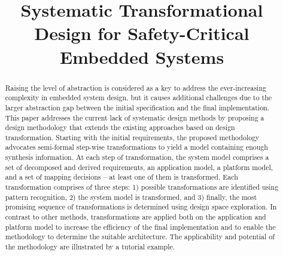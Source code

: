 \documentclass[conference]{IEEEtran}
\theoremstyle{definition}
\begin{document}
\title{Systematic Transformational Design for Safety-Critical Embedded Systems\\
}

\author{
}

\maketitle

\begin{abstract}
Raising the level of abstraction is considered as a key to address the ever-increasing complexity in embedded system design, but it causes additional challenges due to the larger abstraction gap between the initial specification and the final implementation. This paper addresses the current lack of systematic design methods by proposing a  design methodology that extends the existing approaches based on design transformation. Starting with the initial requirements, the proposed methodology advocates semi-formal step-wise transformations to yield a model containing enough synthesis information. At each step of transformation, the system model comprises a set of decomposed and derived requirements, an application model, a platform model, and a set of mapping decisions -- at least one of them is transformed. Each transformation comprises of three steps: 1) possible transformations are identified using pattern recognition, 2) the system model is transformed, and 3) finally, the most promising sequence of transformations is determined using design space exploration. In contrast to other methods, transformations are applied both on the application and platform model to increase the efficiency of the final implementation and to enable the methodology to determine the suitable architecture. The applicability and potential of the methodology are illustrated by a tutorial example.
\end{abstract}
\end{document}
